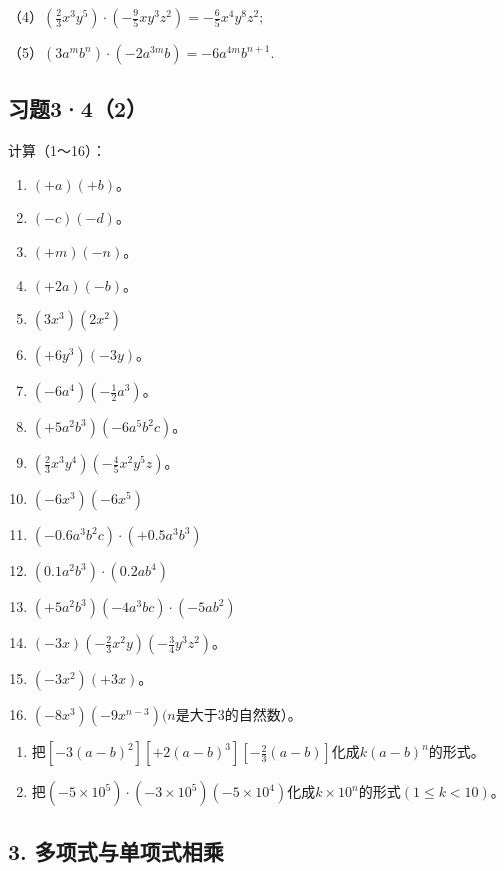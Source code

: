 （4）\(\left(\frac{2}{3} x^3 y^5\right) \cdot \left(-\frac{9}{5} xy^3 z^2\right) = -\frac{6}{5} x^4 y^8 z^2;\)

（5）\((3a^{m}b^{n})\cdot (-2a^{3m}b) = -6a^{4m}b^{n + 1}.\)

\subsection{习题3·4（2）}

计算（1～16）：

\begin{enumerate}[start=1]
\item
  \((+a)(+b)\)。
\item
  \((-c)(-d)\)。
\item
  \((+m)(-n)\)。
\item
  \((+2a)(-b)\)。
\item
  \((3x^{3})(2x^{2})\)
\item
  \((+6y^{3})(-3y)\)。
\item
  \((-6a^{4})\left(-\frac{1}{2} a^{3}\right)\)。
\item
  \((+5a^{2}b^{3})(-6a^{5}b^{2}c)\)。
\item
  \(\left(\frac{2}{3} x^3 y^4\right)\left(-\frac{4}{5} x^2 y^5 z\right)\)。
\item
  \((-6x^{3})(-6x^{5})\)
\item
  \((-0.6a^{3}b^{2}c)\cdot (+0.5a^{3}b^{3})\)
\item
  \((0.1a^{2}b^{3})\cdot (0.2ab^{4})\)
\item
  \((+5a^{2}b^{3})(-4a^{3}bc)\cdot (-5ab^{2})\)
\item
  \((-3x)\left(-\frac{2}{3} x^2 y\right)\left(-\frac{3}{4} y^3 z^2\right)\)。
\item
  \((-3x^{2})(+3x)\)。
\item
  \((-8x^{3})(-9x^{n-3})(n\)是大于3的自然数）。
\end{enumerate}

\begin{enumerate}[start=17]
\item
  把\([-3(a - b)^2][+2(a - b)^3]\left[-\frac{2}{3}(a - b)\right]\)化成\(k(a - b)^n\)的形式。
\item
  把\((-5 \times 10^{5}) \cdot (-3 \times 10^{5})(-5 \times 10^{4})\)化成\(k \times 10^{n}\)的形式\((1 \leqslant k < 10)\)。
\end{enumerate}

\subsection{3. 多项式与单项式相乘}

